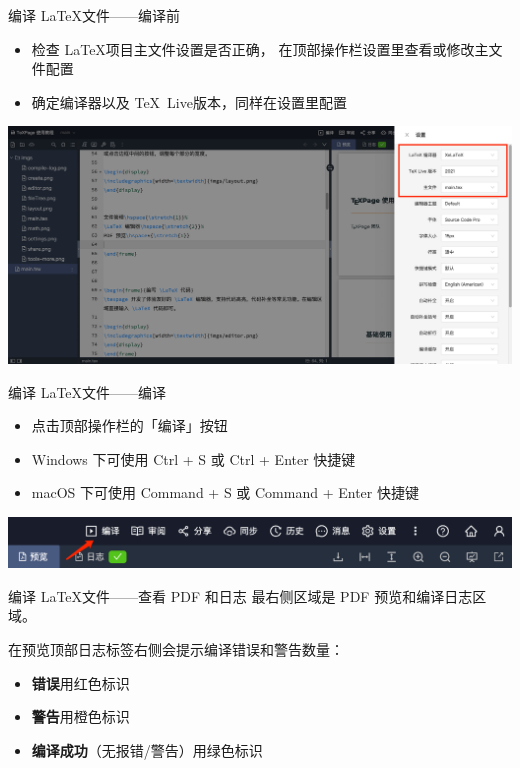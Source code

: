 \documentclass{beamer}
\DeclareRobustCommand\texlive{\TeX\ Live}
\newenvironment{display}{\trivlist\item[]}{\endtrivlist}
\begin{document}
\begin{frame}{编译 \LaTeX 文件\hfill ——编译前}
\begin{itemize}
\item 检查 \LaTeX 项目主文件设置是否正确，
在顶部操作栏设置里查看或修改主文件配置
\item 确定编译器以及 \texlive 版本，同样在设置里配置
\end{itemize}

\begin{display}
\includegraphics[width=\textwidth]{imgs/settings.png}
\end{display}
\end{frame}


\begin{frame}{编译 \LaTeX 文件\hfill ——编译}
\begin{itemize}
\item 点击顶部操作栏的「编译」按钮
\item Windows 下可使用 Ctrl + S 或 Ctrl + Enter 快捷键
\item macOS 下可使用 Command + S 或 Command + Enter 快捷键
\end{itemize}

\begin{display}
\includegraphics[width=\textwidth]{imgs/compile-btn.png}
\end{display}
\end{frame}


\begin{frame}{编译 \LaTeX 文件\hfill ——查看 PDF 和日志}
最右侧区域是 PDF 预览和编译日志区域。

在预览顶部日志标签右侧会提示编译错误和警告数量：
\begin{itemize}
\item \textbf{\color{red}错误}用红色标识
\item \textbf{\color{orange}警告}用橙色标识
\item \textbf{\color{green!80!black}编译成功}（无报错/警告）用绿色标识
\end{itemize}

\end{frame}
\end{document}

